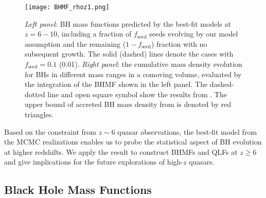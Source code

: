 \documentclass[twocolumn, twocolappendix]{aastex63}
\newcommand{\tlife}{\tau}
\newcommand{\fseed}{f_\mathrm{seed}}
\begin{document}
\begin{CJK*}{UTF8}{gbsn}
\begin{figure*}
\centering
\texttt{[image: BHMF\_rhoz1.png]}
\caption{
{\it Left panel}: BH mass functions predicted by the best-fit models at $z=6-10$,
including a fraction of $\fseed$ seeds evolving by our model assumption and the remaining ($1-\fseed$) fraction with no subsequent growth.
The solid (dashed) lines denote the cases with $\fseed=0.1$ (0.01).
{\it Right panel}: the cumulative mass density evolution for BHs in different mass ranges in a comoving volume, 
evaluated by the integration of the BHMF shown in the left panel.
The dashed-dotted line and open square symbol show the results from \citet{2022MNRAS.513..670N}.
The upper bound of accreted BH mass density from \citet{2013ApJ...778..130T} is denoted by red triangles.
}
\label{fig:BHMF_rhoz}
\vspace{0mm}
\end{figure*}





Based on the constraint from $z\sim 6$ quasar observations, the best-fit model from the MCMC realizations enables
us to probe the statistical aspect of BH evolution at higher redshifts.
We apply the result to construct BHMFs and QLFs at $z\geq 6$ and give implications for
the future explorations of high-$z$ quasars.


\subsection{Black Hole Mass Functions}



\end{CJK*}
\end{document}
